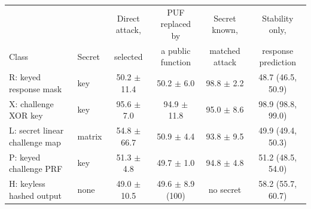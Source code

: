 \begin{tabular}{llcccc}
\toprule
 & & Direct attack, & PUF replaced by & Secret known, & Stability only, \\
Class & Secret & selected & a public function & matched attack & response prediction \\
\midrule
R: keyed response mask & key & 50.2 $\pm$ 11.4 & 50.2 $\pm$ 6.0 & 98.8 $\pm$ 2.2 & 48.7 (46.5, 50.9) \\
X: challenge XOR key & key & 95.6 $\pm$ 7.0 & 94.9 $\pm$ 11.8 & 95.0 $\pm$ 8.6 & 98.9 (98.8, 99.0) \\
L: secret linear challenge map & matrix & 54.8 $\pm$ 66.7 & 50.9 $\pm$ 4.4 & 93.8 $\pm$ 9.5 & 49.9 (49.4, 50.3) \\
P: keyed challenge PRF & key & 51.3 $\pm$ 4.8 & 49.7 $\pm$ 1.0 & 94.8 $\pm$ 4.8 & 51.2 (48.5, 54.0) \\
H: keyless hashed output & none & 49.0 $\pm$ 10.5 & 49.6 $\pm$ 8.9 (100) & no secret & 58.2 (55.7, 60.7) \\
\bottomrule
\end{tabular}
